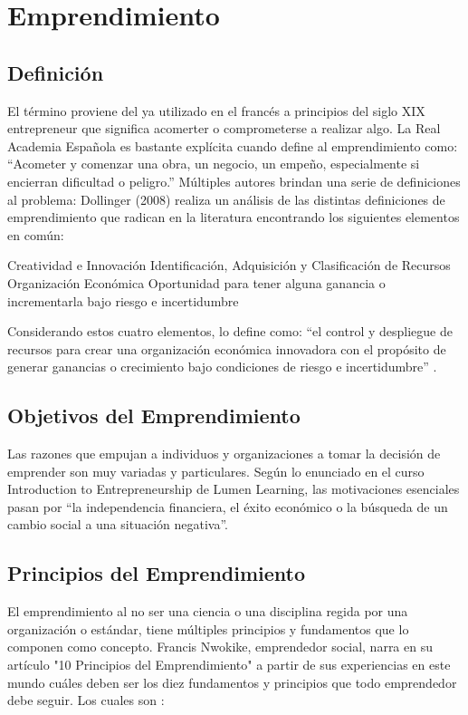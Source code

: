 \section{Emprendimiento}

\subsection{Definición}
El término proviene del ya utilizado en el francés a principios del siglo XIX entrepreneur que significa acomerter o comprometerse a realizar algo. La Real Academia Española es bastante explícita cuando define al emprendimiento como: “Acometer y comenzar una obra, un negocio, un empeño, especialmente si encierran dificultad o peligro.” Múltiples autores brindan una serie de definiciones al problema:
Dollinger (2008) realiza un análisis de las distintas definiciones de emprendimiento que radican en la literatura encontrando los siguientes elementos en común:

	Creatividad e Innovación
	Identificación, Adquisición y Clasificación de Recursos
	Organización Económica
	Oportunidad para tener alguna ganancia o incrementarla bajo riesgo e incertidumbre

Considerando estos cuatro elementos, lo define como: “el control y despliegue de recursos para crear una organización económica innovadora con el propósito de generar ganancias o crecimiento bajo condiciones de riesgo e incertidumbre” \cite{dollinger2008}.

\subsection{Objetivos del Emprendimiento}

Las razones que empujan a individuos y organizaciones a tomar la decisión de emprender son muy variadas y particulares. Según lo enunciado en el curso Introduction to Entrepreneurship de Lumen Learning, las motivaciones esenciales pasan por “la independencia financiera, el éxito económico o la búsqueda de un cambio social a una situación negativa”\cite{boundless}.

\subsection{Principios del Emprendimiento}

El emprendimiento al no ser una ciencia o una disciplina regida por una organización o estándar, tiene múltiples principios y fundamentos que lo componen como concepto. Francis Nwokike, emprendedor social, narra en su artículo "10 Principios del Emprendimiento" a partir de sus experiencias en este mundo cuáles deben ser los diez fundamentos y principios que todo emprendedor debe seguir. Los cuales son \cite{principles}:

